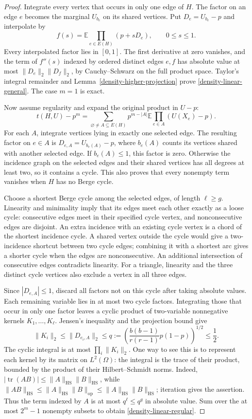 \documentclass[a4paper,11pt,reqno]{amsart}
\theoremstyle{plain}
\theoremstyle{definition}
\theoremstyle{remark}
\begin{document}
\begin{proof}
Integrate every vertex that occurs in only one edge of $H$.
The factor on an edge $e$ becomes the marginal $U_{b_e}$ on its
shared vertices.  Put $D_e=U_{b_e}-p$ and interpolate by
\[
 f(s)=\mathbb E\prod_{e\in E(H)}(p+sD_e),\qquad 0\le s\le1.
\]
Every interpolated factor lies in $[0,1]$.  The first derivative
at zero vanishes, and the term of $f''(s)$ indexed by ordered
distinct edges $e,f$ has absolute value at most
$\|D_e\|_2\|D_f\|_2$, by Cauchy--Schwarz on the full product
space.  Taylor's integral remainder and
Lemma~\ref{density-higher-projection} prove
\eqref{density-linear-general}.  The case $m=1$ is exact.

Now assume regularity and expand the original product in $U-p$:
\[
 t(H,U)-p^m
  =\sum_{\varnothing\ne A\subseteq E(H)}p^{m-|A|}
      \mathbb E\prod_{e\in A}(U(X_e)-p).
\]
For each $A$, integrate vertices lying in exactly one selected edge.
The resulting factor on $e\in A$ is
$D_{e,A}=U_{b_e(A)}-p$, where $b_e(A)$ counts its vertices shared
with another selected edge.  If $b_e(A)\le1$, this factor is zero.
Otherwise the incidence graph on the selected edges and their
shared vertices has all degrees at least two, so it contains a
cycle.  This also proves that every nonempty term vanishes when
$H$ has no Berge cycle.

Choose a shortest Berge cycle among the selected edges, of length
$\ell\ge g$.  Linearity and minimality imply that its edges meet
each other exactly as a loose cycle: consecutive edges meet in
their specified cycle vertex, and nonconsecutive edges are
disjoint.  An extra incidence with an existing cycle vertex is a
chord of the shortest incidence cycle.  A shared vertex outside
the cycle would give a two-incidence shortcut between two cycle
edges; combining it with a shortest arc gives a shorter cycle
when the edges are nonconsecutive.  An additional intersection of
consecutive edges contradicts linearity.  For a triangle, linearity and the
three distinct cycle vertices also exclude a vertex in all three
edges.

Since $|D_{e,A}|\le1$, discard all factors not on this cycle after
taking absolute values.  Each remaining variable lies in at most
two cycle factors.  Integrating those that occur in only one
factor leaves a cyclic product of two-variable nonnegative
kernels $K_1,\ldots,K_\ell$.  Jensen's inequality and the
projection bound give
\[
 \|K_i\|_2\le\|D_{e_i,A}\|_2
 \le q:=\left(\frac{b(b-1)}{r(r-1)}p(1-p)\right)^{1/2}
 \le\frac12.
\]
The cyclic integral is at most $\prod_i\|K_i\|_2$.  One way to
see this is to represent each kernel by its matrix on
$L^2(\Omega)$: the integral is the trace of their product, bounded
by the product of their Hilbert--Schmidt norms.  Indeed,
$|\operatorname{tr}(AB)|\le\|A\|_{\mathrm{HS}}
\|B\|_{\mathrm{HS}}$, while
$\|AB\|_{\mathrm{HS}}\le\|A\|_{\mathrm{HS}}
\|B\|_{\mathrm{op}}\le\|A\|_{\mathrm{HS}}
\|B\|_{\mathrm{HS}}$; iteration gives the assertion.  Thus the term indexed by $A$ is
at most $q^\ell\le q^g$ in absolute value.  Sum over the at most
$2^m-1$ nonempty subsets to obtain
\eqref{density-linear-regular}.


\end{proof}
\end{document}
